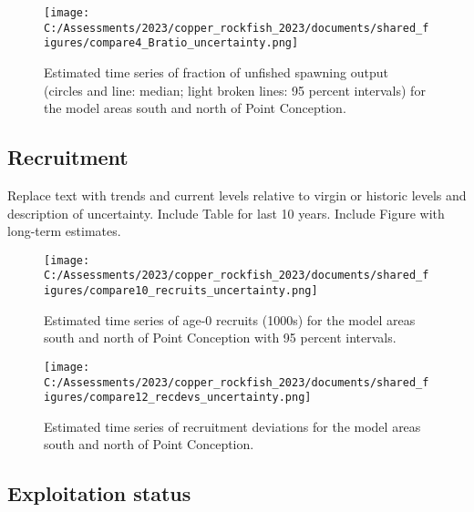 \documentclass[11pt,
  english,
  letterpaper,
]{article}
\begin{document}
\begin{figure}
\centering
\texttt{[image: C:/Assessments/2023/copper\_rockfish\_2023/documents/shared\_figures/compare4\_Bratio\_uncertainty.png]}
\caption{Estimated time series of fraction of unfished spawning output (circles and line: median; light broken lines: 95 percent intervals) for the model areas south and north of Point Conception.\label{fig:es-depl}}
\end{figure}

\clearpage

\hypertarget{recruitment}{%
\subsection*{Recruitment}\label{recruitment}}

Replace text with trends and current levels relative to virgin or historic levels and description of uncertainty. Include Table for last 10 years. Include Figure with long-term estimates.





\begin{figure}
\centering
\texttt{[image: C:/Assessments/2023/copper\_rockfish\_2023/documents/shared\_figures/compare10\_recruits\_uncertainty.png]}
\caption{Estimated time series of age-0 recruits (1000s) for the model areas south and north of Point Conception with 95 percent intervals.\label{fig:es-recruits}}
\end{figure}

\begin{figure}
\centering
\texttt{[image: C:/Assessments/2023/copper\_rockfish\_2023/documents/shared\_figures/compare12\_recdevs\_uncertainty.png]}
\caption{Estimated time series of recruitment deviations for the model areas south and north of Point Conception.\label{fig:es-rec-devs}}
\end{figure}

\clearpage

\hypertarget{exploitation-status}{%
\subsection*{Exploitation status}\label{exploitation-status}}
\end{document}
